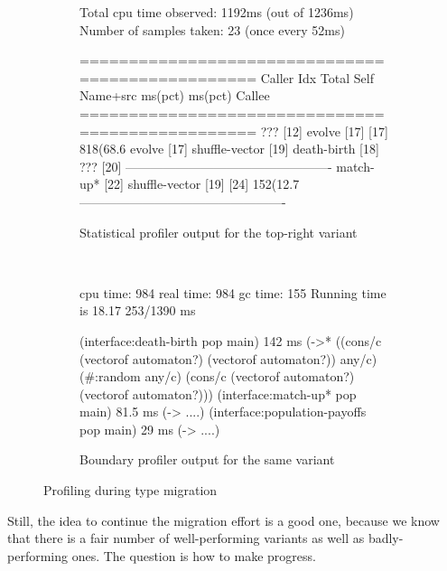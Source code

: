 \begin{figure}[htb]
\begin{subfigure}[t]{0.53\columnwidth}
    \footnotesize
    \begin{boxedverbatim}
  Total cpu time observed: 1192ms (out of 1236ms)
  Number of samples taken: 23 (once every 52ms)

=================================================
                              Caller
 Idx   Total       Self      Name+src
       ms(pct)     ms(pct)    Callee
=================================================
                              ??? [12]
                              evolve [17]
[17]  818(68.6%
                              evolve [17]
                              shuffle-vector [19]
                              death-birth [18]
                              ??? [20]
-------------------------------------------------
                              match-up* [22]
                              shuffle-vector [19]
[24]  152(12.7%
-------------------------------------------------
    \end{boxedverbatim}
    \caption{Statistical profiler output for the top-right variant} \label{f:fsm-code:statistical}
  \end{subfigure}~\begin{subfigure}[t]{0.44\columnwidth}
    \footnotesize
    \begin{boxedverbatim}
cpu time: 984 real time: 984 gc time: 155
Running time is 18.17%
253/1390 ms

(interface:death-birth pop main)
  142 ms
  (->* ((cons/c (vectorof automaton?)
                (vectorof automaton?))
        any/c)
       (#:random any/c)
       (cons/c (vectorof automaton?)
               (vectorof automaton?)))
(interface:match-up* pop main)
  81.5 ms
  (-> ....)
(interface:population-payoffs pop main)
  29 ms
  (-> ....)


    \end{boxedverbatim}
    \caption{Boundary profiler output for the same variant} \label{f:fsm-code:boundary}
  \end{subfigure}

  \caption{Profiling during type migration} \label{f:fsm-code}
\end{figure}

Still, the idea to continue the migration effort is a good one, because we know
that there is a fair number of well-performing
variants as well as badly-performing ones. The question is how to make progress.

